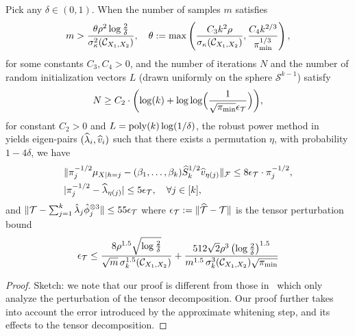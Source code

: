 \documentclass{article}
\begin{document}
\begin{theorem} \label{thm:samplebound}
\vspace{-3mm}
Pick  any $\delta\in (0,1)$. When the number of samples $m$ satisfies
\[ m >\frac{\theta\rho^2  \log\frac{2}{\delta}}{\sigma^2_\kappa(\Ccal_{X_1, X_2})},
\quad \theta:= \max\left(\frac{C_3 k^2 \rho}{\sigma_\kappa( \Ccal_{X_1, X_2})}, \frac{C_4k^{2/3}\iffalse(1+\sigma_{k+1}(\Ccal_{X_1, X_2}))^2 \fi }{\pi_{\min}^{1/3}}\right),\] for some constants $C_3, C_4>0$, and the number of iterations $N$  and  the number of random initialization vectors $L$  (drawn uniformly on the sphere $\mathcal{S}^{k-1}$)  satisfy
\begin{align*}
  N \geq C_2 \cdot \biggl( \log(k) + \log\log\Bigl(
 \frac{1}{\sqrt{\pi_{\min}}\epsilon_{{\mathcal{T}}}} \Bigr) \biggr),
\end{align*}
for constant $C_2>0$ and  $L = \operatorname{poly}(k) \log(1/\delta)$,  the robust power method in~\cite{AnandkumarEtal:tensor12} yields eigen-pairs $(\widehat{\lambda}_i, \widehat{v}_i)$ such that there exists a permutation $\eta$, with probability $1-4\delta$, we have
\begin{align*}
&\|\pi^{-1/2}_{j} \mu_{X|h=j}-(\beta_1,\ldots,\beta_k) \widehat  S_k^{1/2}\widehat{v}_{\eta(j)}\|_{\mathcal{F}} \leq 8 \epsilon_{{\mathcal{T}}} \cdot\pi^{-1/2}_{j}
, \\
&|\pi^{-1/2}_{j}-\widehat{\lambda}_{\eta(j)}| \leq  5\epsilon_{{\mathcal{T}}}, \quad \forall j \in [k],
\end{align*}
and $\|{\mathcal{T}} - \sum\nolimits_{j=1}^k \hat\lambda_j \hat{\phi}_j^{\otimes 3} \| \leq 55\epsilon_{{\mathcal{T}}}$ where $\epsilon_{{\mathcal{T}}}:= \|\widehat{{\mathcal{T}}} - {\mathcal{T}}\|$ is the tensor perturbation bound
\begin{align*} \epsilon_{{\mathcal{T}}} \leq
\frac{8 \rho^{1.5} \sqrt{\log\frac{2}{\delta}}}{\sqrt{m} \, \sigma_k^{1.5}(\mathcal{C}_{X_1, X_2})} + \frac{512 \sqrt{2} \rho^3 \left(\log\frac{2}{\delta}\right)^{1.5}}{m^{1.5} \,\sigma_k^{3}(\mathcal{C}_{X_1, X_2}) \sqrt{\pi_{\min}}}
\end{align*}
\vspace{-3mm}
\end{theorem}

\begin{proof}
Sketch: we note that our proof is different from those in~\citet{AnandkumarEtal:tensor12} which only analyze the perturbation of the tensor decomposition. Our proof further takes into account the error introduced by the approximate whitening step, and its effects to the tensor decomposition.
\vspace{-4mm}
\end{proof}
\end{document}
